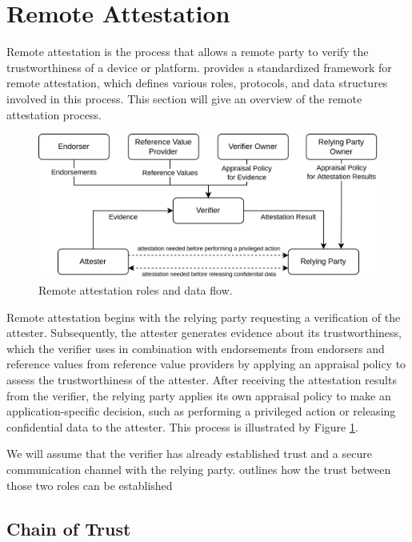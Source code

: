 \section{Remote Attestation}
\label{sec:remote-attestation}

Remote attestation is the process that allows a remote party to verify the
trustworthiness of a device or platform.  \cite{rfc9334}
provides a standardized framework for remote attestation, which defines various
roles, protocols, and data structures involved in this process. This section
will give an overview of the remote attestation process.

\begin{figure}[H]
  \centering
  \includegraphics[width=0.8\linewidth]{resources/rats-data-flow.drawio.png}
  \caption{Remote attestation roles and data flow.}
  \label{fig:rats-data-flow}
\end{figure}

Remote attestation begins with the relying party requesting a verification of
the attester. Subsequently, the attester generates evidence about its
trustworthiness, which the verifier uses in combination with endorsements from
endorsers and reference values from reference value providers by applying an
appraisal policy to assess the trustworthiness of the attester. After receiving
the attestation results from the verifier, the relying party applies its own
appraisal policy to make an application-specific decision, such as performing a
privileged action or releasing confidential data to the attester. This process
is illustrated by Figure \ref{fig:rats-data-flow}.

We will assume that the verifier has already established trust and a secure
communication channel with the relying party.  outlines how
the trust between those two roles can be established \cite[Section~7.1]{rfc9334}

\subsection{Chain of Trust}
\label{sec:ra-chain-of-trust}

